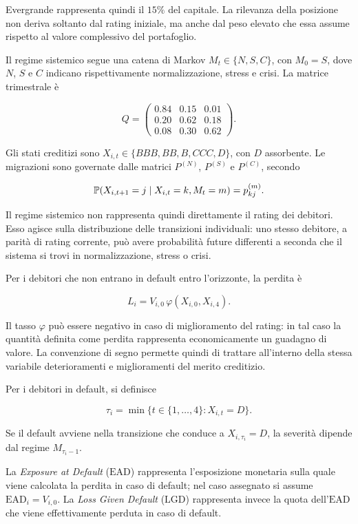 Evergrande rappresenta quindi il $15\%$ del capitale. La rilevanza della
posizione non deriva soltanto dal rating iniziale, ma anche dal peso elevato
che essa assume rispetto al valore complessivo del portafoglio.

Il regime sistemico segue una catena di Markov
$M_t\in\{N,S,C\}$, con $M_0=S$, dove $N$, $S$ e $C$ indicano
rispettivamente normalizzazione, stress e crisi. La matrice trimestrale \`e

\[
Q=
\begin{pmatrix}
0.84 & 0.15 & 0.01
\\
0.20 & 0.62 & 0.18
\\
0.08 & 0.30 & 0.62
\end{pmatrix}.
\]

Gli stati creditizi sono
$X_{i,t}\in\{BBB,BB,B,CCC,D\}$, con $D$ assorbente. Le migrazioni sono
governate dalle matrici $P^{(N)}$, $P^{(S)}$ e $P^{(C)}$, secondo

\[
\mathbb{P}(X_{i,t+1}=j\mid X_{i,t}=k,M_t=m)=p_{kj}^{(m)}.
\]

Il regime sistemico non rappresenta quindi direttamente il rating dei
debitori. Esso agisce sulla distribuzione delle transizioni individuali:
uno stesso debitore, a parit\`a di rating corrente, pu\`o avere probabilit\`a
future differenti a seconda che il sistema si trovi in normalizzazione,
stress o crisi.

Per i debitori che non entrano in default entro l'orizzonte, la perdita \`e

\[
L_i
=
V_{i,0}\,
\varphi(X_{i,0},X_{i,4}).
\]

Il tasso $\varphi$ pu\`o essere negativo in caso di miglioramento del rating:
in tal caso la quantit\`a definita come perdita rappresenta economicamente un
guadagno di valore. La convenzione di segno permette quindi di trattare
all'interno della stessa variabile deterioramenti e miglioramenti del merito
creditizio.

Per i debitori in default, si definisce

\[
\tau_i
=
\min\{t\in\{1,\ldots,4\}:X_{i,t}=D\}.
\]

Se il default avviene nella transizione che conduce a
$X_{i,\tau_i}=D$, la severit\`a dipende dal regime $M_{\tau_i-1}$.

La \emph{Exposure at Default} ($\mathrm{EAD}$) rappresenta l'esposizione monetaria
sulla quale viene calcolata la perdita in caso di default; nel caso
assegnato si assume $\mathrm{EAD}_i=V_{i,0}$. La \emph{Loss Given Default} ($\mathrm{LGD}$)
rappresenta invece la quota dell'$\mathrm{EAD}$ che viene effettivamente perduta in
caso di default.


